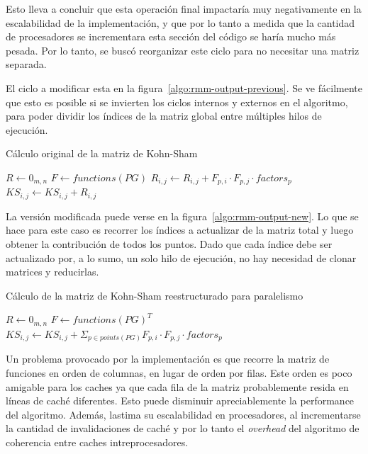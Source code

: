 Esto lleva a concluir que esta operaci\'on final impactar\'ia muy
negativamente en la escalabilidad de la implementaci\'on, y que por lo tanto a
medida que la cantidad de procesadores se incrementara esta secci\'on del
c\'odigo se har\'ia mucho m\'as pesada. Por lo tanto, se busc\'o reorganizar
este ciclo para no necesitar una matriz separada.

El ciclo a modificar esta en la figura~\ref{algo:rmm-output-previous}.
Se ve f\'acilmente que esto es posible si se invierten los ciclos internos y externos en
el algoritmo, para poder dividir los \'indices de la matriz global entre m\'ultiples
hilos de ejecuci\'on.

\begin{algorithm}[H]
    \centering
    \caption{C\'alculo original de la matriz de Kohn-Sham}
    \label{algo:rmm-output-previous}
    \begin{algorithmic}
        \State $R \gets 0_{m,n}$
        \State $F \gets functions(PG)$
            \State $R_{i,j} \gets R_{i,j} + F_{p,i} \cdot F_{p,j} \cdot factors_{p}$
            \EndFor
        \EndFor
            \State $KS_{i,j} \gets KS_{i,j} + R_{i,j}$
        \EndFor
    \end{algorithmic}
\end{algorithm}

La versi\'on modificada puede verse en la figura~\ref{algo:rmm-output-new}. Lo que
se hace para este caso es recorrer los \'indices a actualizar de la matriz total
y luego obtener la contribuci\'on de todos los puntos. Dado que cada \'indice debe
ser actualizado por, a lo sumo, un solo hilo de ejecuci\'on, no hay necesidad de
clonar matrices y reducirlas.

\begin{algorithm}[H]
    \centering
    \caption{C\'alculo de la matriz de Kohn-Sham reestructurado para paralelismo}
    \label{algo:rmm-output-new}
    \begin{algorithmic}
        \State $R \gets 0_{m,n}$
        \State $F \gets functions(PG)^T$
            \State $KS_{i,j} \gets KS_{i,j} + \displaystyle \Sigma_{p \in points(PG)} F_{p,i} \cdot F_{p,j} \cdot factors_{p}$
        \EndFor
    \end{algorithmic}
\end{algorithm}

Un problema provocado por la implementaci\'on es que recorre la matriz de funciones
en orden de columnas, en lugar de orden por filas. Este orden es poco amigable
para los caches ya que cada fila de la matriz probablemente resida en l\'ineas de
cach\'e diferentes. Esto puede disminuir apreciablemente la performance del algoritmo.
Adem\'as, lastima su escalabilidad en procesadores, al incrementarse la cantidad de
invalidaciones de cach\'e y por lo tanto el \textit{overhead} del algoritmo de
coherencia entre caches intreprocesadores.


